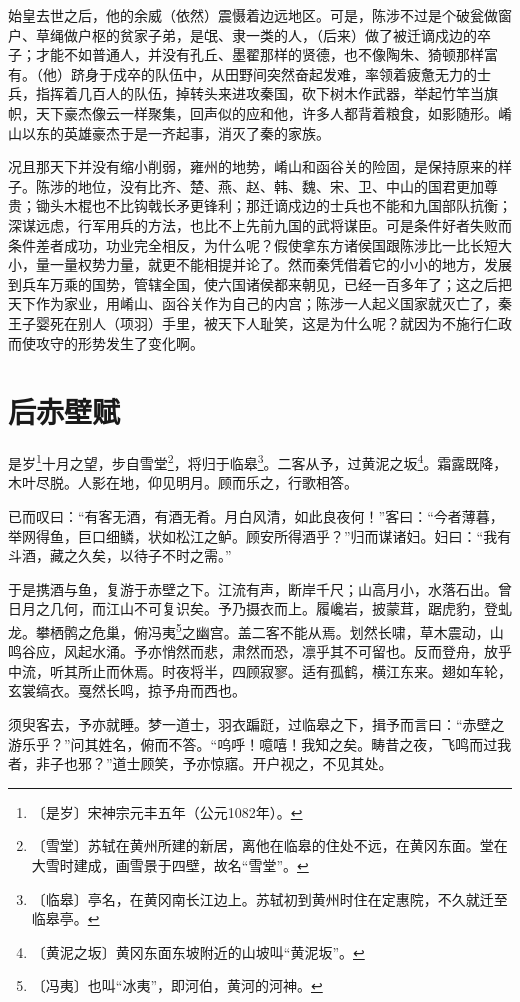 \documentclass[12pt,UTF-8,openany,a4]{ctexbook}
\begin{document}
\begin{large}
    始皇去世之后，他的余威（依然）震慑着边远地区。可是，陈涉不过是个破瓮做窗户、草绳做户枢的贫家子弟，是氓、隶一类的人，（后来）做了被迁谪戍边的卒子；才能不如普通人，并没有孔丘、墨翟那样的贤德，也不像陶朱、猗顿那样富有。（他）跻身于戍卒的队伍中，从田野间突然奋起发难，率领着疲惫无力的士兵，指挥着几百人的队伍，掉转头来进攻秦国，砍下树木作武器，举起竹竿当旗帜，天下豪杰像云一样聚集，回声似的应和他，许多人都背着粮食，如影随形。崤山以东的英雄豪杰于是一齐起事，消灭了秦的家族。
    
    况且那天下并没有缩小削弱，雍州的地势，崤山和函谷关的险固，是保持原来的样子。陈涉的地位，没有比齐、楚、燕、赵、韩、魏、宋、卫、中山的国君更加尊贵；锄头木棍也不比钩戟长矛更锋利；那迁谪戍边的士兵也不能和九国部队抗衡；深谋远虑，行军用兵的方法，也比不上先前九国的武将谋臣。可是条件好者失败而条件差者成功，功业完全相反，为什么呢？假使拿东方诸侯国跟陈涉比一比长短大小，量一量权势力量，就更不能相提并论了。然而秦凭借着它的小小的地方，发展到兵车万乘的国势，管辖全国，使六国诸侯都来朝见，已经一百多年了；这之后把天下作为家业，用崤山、函谷关作为自己的内宫；陈涉一人起义国家就灭亡了，秦王子婴死在别人（项羽）手里，被天下人耻笑，这是为什么呢？就因为不施行仁政而使攻守的形势发生了变化啊。
    

\end{large}



\chapter{后赤壁赋}

\begin{large}
    
    是岁\footnote{〔是岁〕\yiwen 宋神宗元丰五年（公元1082年）。}十月之望，步自雪堂\footnote{〔雪堂〕\yiwen 苏轼在黄州所建的新居，离他在临皋的住处不远，在黄冈东面。堂在大雪时建成，画雪景于四壁，故名“雪堂”。}，将归于临皋\footnote{〔临皋〕\yiwen 亭名，在黄冈南长江边上。苏轼初到黄州时住在定惠院，不久就迁至临皋亭。}。二客从予，过黄泥之坂\footnote{〔黄泥之坂〕\yiwen 黄冈东面东坡附近的山坡叫“黄泥坂”。}。霜露既降，木叶尽脱。人影在地，仰见明月。顾而乐之，行歌相答。
    
    已而叹曰：“有客无酒，有酒无肴。月白风清，如此良夜何！”客曰：“今者薄暮，举网得鱼，巨口细鳞，状如松江之鲈。顾安所得酒乎？”归而谋诸妇。妇曰：“我有斗酒，藏之久矣，以待子不时之需。”
    
    于是携酒与鱼，复游于赤壁之下。江流有声，断岸千尺；山高月小，水落石出。曾日月之几何，而江山不可复识矣。予乃摄衣而上。履巉岩，披蒙茸，踞虎豹，登虬龙。攀栖鹘之危巢，俯冯夷\footnote{〔冯夷〕\yiwen 也叫“冰夷”，即河伯，黄河的河神。}之幽宫。盖二客不能从焉。划然长啸，草木震动，山鸣谷应，风起水涌。予亦悄然而悲，肃然而恐，凛乎其不可留也。反而登舟，放乎中流，听其所止而休焉。时夜将半，四顾寂寥。适有孤鹤，横江东来。翅如车轮，玄裳缟衣。戛然长鸣，掠予舟而西也。
    
    须臾客去，予亦就睡。梦一道士，羽衣蹁跹，过临皋之下，揖予而言曰：“赤壁之游乐乎？”问其姓名，俯而不答。“呜呼！噫嘻！我知之矣。畴昔之夜，飞鸣而过我者，非子也邪？”道士顾笑，予亦惊寤。开户视之，不见其处。
\end{large}
\end{document}
